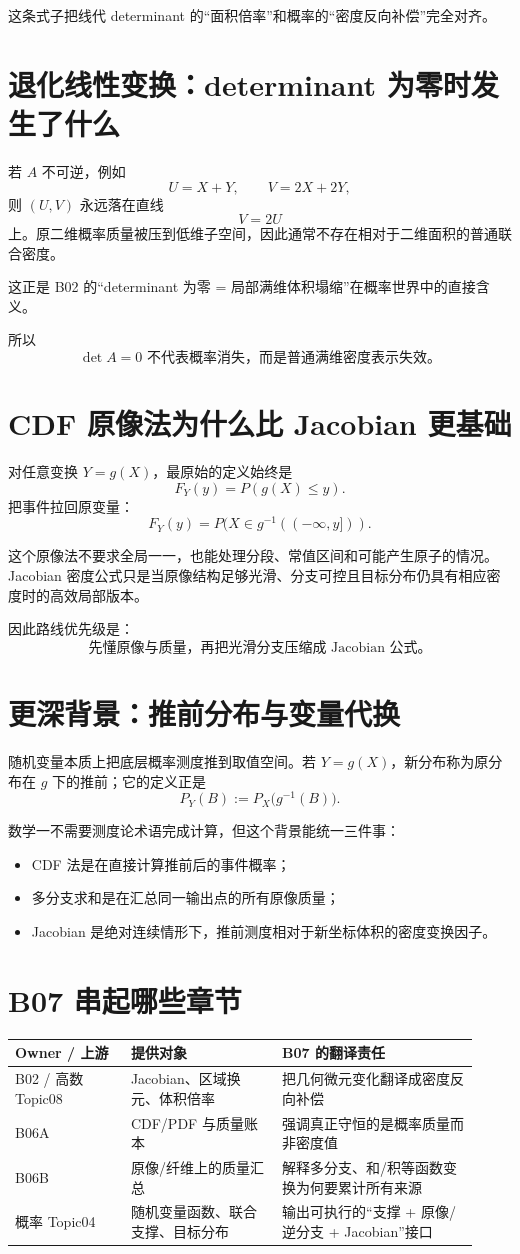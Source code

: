 \documentclass[profile=standard]{ipara-handbook}
\begin{document}
这条式子把线代 determinant 的“面积倍率”和概率的“密度反向补偿”完全对齐。

\section{退化线性变换：determinant 为零时发生了什么}
若 $A$ 不可逆，例如
\[
U=X+Y,
\qquad V=2X+2Y,
\]
则 $(U,V)$ 永远落在直线
\[
V=2U
\]
上。原二维概率质量被压到低维子空间，因此通常不存在相对于二维面积的普通联合密度。

这正是 B02 的“determinant 为零 = 局部满维体积塌缩”在概率世界中的直接含义。

所以
\[
\boxed{\det A=0\text{ 不代表概率消失，而是普通满维密度表示失效。}}
\]

\section{CDF 原像法为什么比 Jacobian 更基础}
对任意变换 $Y=g(X)$，最原始的定义始终是
\[
F_Y(y)=P(g(X)\le y).
\]
把事件拉回原变量：
\[
F_Y(y)=P(X\in g^{-1}(( -\infty,y])).
\]

这个原像法不要求全局一一，也能处理分段、常值区间和可能产生原子的情况。Jacobian 密度公式只是当原像结构足够光滑、分支可控且目标分布仍具有相应密度时的高效局部版本。

因此路线优先级是：
\[
\boxed{\text{先懂原像与质量，再把光滑分支压缩成 Jacobian 公式。}}
\]

\section{更深背景：推前分布与变量代换}
随机变量本质上把底层概率测度推到取值空间。若 $Y=g(X)$，新分布称为原分布在 $g$ 下的推前；它的定义正是
\[
P_Y(B):=P_X\bigl(g^{-1}(B)\bigr).
\]

数学一不需要测度论术语完成计算，但这个背景能统一三件事：
\begin{itemize}
\item CDF 法是在直接计算推前后的事件概率；
\item 多分支求和是在汇总同一输出点的所有原像质量；
\item Jacobian 是绝对连续情形下，推前测度相对于新坐标体积的密度变换因子。
\end{itemize}

\section{B07 串起哪些章节}
\begin{tabular}{p{0.23\linewidth}p{0.30\linewidth}p{0.39\linewidth}}
\hline
Owner / 上游 & 提供对象 & B07 的翻译责任\\
\hline
B02 / 高数 Topic08 & Jacobian、区域换元、体积倍率 & 把几何微元变化翻译成密度反向补偿\\
B06A & CDF/PDF 与质量账本 & 强调真正守恒的是概率质量而非密度值\\
B06B & 原像/纤维上的质量汇总 & 解释多分支、和/积等函数变换为何要累计所有来源\\
概率 Topic04 & 随机变量函数、联合支撑、目标分布 & 输出可执行的“支撑 + 原像/逆分支 + Jacobian”接口\\
\hline
\end{tabular}
\end{document}
